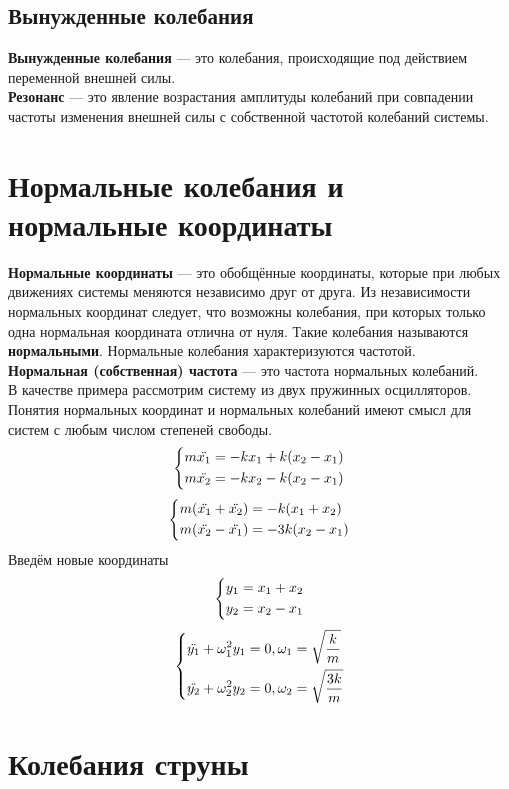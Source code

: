 \documentclass[fleqn,a4paper,12pt,titlepage,finall]{article}
\begin{document}
\subsection{Вынужденные колебания}
{\bf Вынужденные колебания} --- это колебания, происходящие под действием
переменной внешней силы. \\
{\bf Резонанс} --- это явление возрастания амплитуды колебаний при совпадении
частоты изменения внешней силы с собственной частотой колебаний системы. \\

\section{Нормальные колебания и нормальные координаты}
{\bf Нормальные координаты} --- это обобщённые координаты, которые при любых
движениях системы меняются независимо друг от друга. Из независимости нормальных
координат следует, что возможны колебания, при которых только одна нормальная
координата отлична от нуля. Такие колебания называются {\bf нормальными}.
Нормальные колебания характеризуются частотой. \\
{\bf Нормальная (собственная) частота} --- это частота нормальных колебаний.\\
В качестве примера рассмотрим систему из двух пружинных осцилляторов.
Понятия нормальных координат и нормальных колебаний имеют смысл для систем с
любым числом степеней свободы.
\[\begin{dcases}
	m\ddot{x_1} = -kx_1 + k(x_2-x_1) \\
	m\ddot{x_2} = -kx_2 - k(x_2-x_1) 
\end{dcases}\]
\[\begin{dcases}
	m(\ddot{x_1} + \ddot{x_2}) = -k(x_1+x_2) \\
	m(\ddot{x_2} - \ddot{x_1}) = -3k(x_2-x_1) 
\end{dcases}\]
Введём новые координаты
\[\begin{dcases}
	y_1 = x_1 + x_2 \\
	y_2 = x_2 - x_1
\end{dcases}\]
\[\begin{dcases}
	\ddot{y_1} + \omega_1^2y_1 = 0, \omega_1 = \sqrt{\frac{k}{m}} \\
	\ddot{y_2} + \omega_2^2y_2 = 0, \omega_2 = \sqrt{\frac{3k}{m}}
\end{dcases}\]

\section{Колебания струны}
\end{document}
